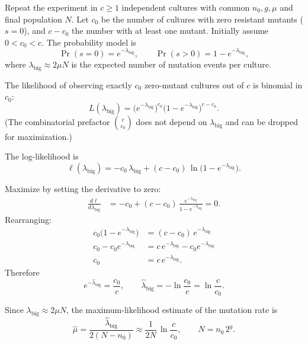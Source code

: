 Repeat the experiment in $c\geq1$ independent cultures with common $n_0,g,\mu$ and final population $N$. Let $c_0$ be the number of cultures with zero resistant mutants ($s=0$), and $c-c_0$ the number with at least one mutant. Initially assume $0<c_0<c$. The probability model is
\begin{equation}\label{eq:lecture03-pzero-model}
\Pr(s=0) = e^{-\lambda_{\mathrm{big}}},
\qquad
\Pr(s>0) = 1 - e^{-\lambda_{\mathrm{big}}},
\end{equation}
where $\lambda_{\mathrm{big}}\approx 2\mu N$ is the expected number of mutation events per culture.

The likelihood of observing exactly $c_0$ zero-mutant cultures out of $c$ is binomial in $c_0$:
\begin{equation}\label{eq:lecture03-likelihood}
L(\lambda_{\mathrm{big}})
= \bigl(e^{-\lambda_{\mathrm{big}}}\bigr)^{c_0}
  \bigl(1-e^{-\lambda_{\mathrm{big}}}\bigr)^{c-c_0}.
\end{equation}
(The combinatorial prefactor $\binom{c}{c_0}$ does not depend on $\lambda_{\mathrm{big}}$ and can be dropped for maximization.)

The log-likelihood is
\begin{equation}\label{eq:lecture03-loglik}
\ell(\lambda_{\mathrm{big}})
= -c_0\,\lambda_{\mathrm{big}}
+ (c-c_0)\,\ln\!\bigl(1-e^{-\lambda_{\mathrm{big}}}\bigr).
\end{equation}

Maximize by setting the derivative to zero:
\begin{align}
\frac{d\ell}{d\lambda_{\mathrm{big}}}
&= -c_0
+ (c-c_0)\,\frac{e^{-\lambda_{\mathrm{big}}}}{1-e^{-\lambda_{\mathrm{big}}}}
= 0 .
\end{align}
Rearranging:
\begin{align}
c_0\bigl(1-e^{-\lambda_{\mathrm{big}}}\bigr)
&= (c-c_0)\,e^{-\lambda_{\mathrm{big}}} \\
c_0 - c_0 e^{-\lambda_{\mathrm{big}}}
&= c\,e^{-\lambda_{\mathrm{big}}} - c_0 e^{-\lambda_{\mathrm{big}}} \\
c_0 &= c\,e^{-\lambda_{\mathrm{big}}} .
\end{align}
Therefore
\begin{equation}\label{eq:lecture03-mle-lambda}
e^{-\hat{\lambda}_{\mathrm{big}}} = \frac{c_0}{c},
\qquad
\hat{\lambda}_{\mathrm{big}} = -\ln\!\frac{c_0}{c} = \ln\!\frac{c}{c_0}.
\end{equation}

Since $\lambda_{\mathrm{big}}\approx 2\mu N$, the maximum-likelihood estimate of the mutation rate is
\begin{equation}\label{eq:lecture03-mle-mu}
\hat{\mu}
= \frac{\hat{\lambda}_{\mathrm{big}}}{2(N-n_0)}
\approx \frac{1}{2N}\,\ln\!\frac{c}{c_0},
\qquad N = n_0\,2^{g}.
\end{equation}


